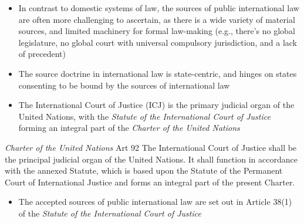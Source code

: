 \begin{itemize}
    \item In contrast to domestic systems of law, the sources of public international law are often more challenging to ascertain, as there is a wide variety of material sources, and limited machinery for formal law-making (e.g., there's no global legislature, no global court with universal compulsory jurisdiction, and a lack of precedent)
    \item The source doctrine in international law is state-centric, and hinges on states consenting to be bound by the sources of international law
    \item The International Court of Justice (ICJ) is the primary judicial organ of the United Nations, with the \textit{Statute of the International Court of Justice} forming an integral part of the \textit{Charter of the United Nations}
\end{itemize}

\begin{conventiondetails}{\textit{Charter of the United Nations} Art 92}
    \flushleft
    The International Court of Justice shall be the principal judicial organ of the United Nations. It shall function in accordance with the annexed Statute, which is based upon the Statute of the Permanent Court of International Justice and forms an integral part of the present Charter.
\end{conventiondetails}

\begin{itemize}
    \item The accepted sources of public international law are set out in Article 38(1) of the \textit{Statute of the International Court of Justice}
\end{itemize}

